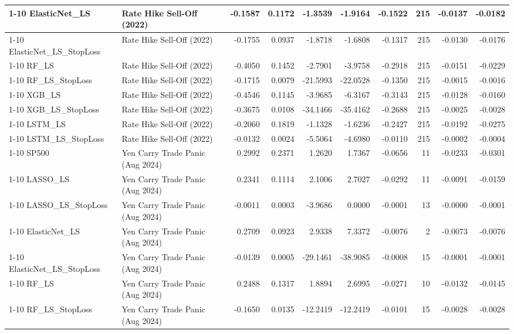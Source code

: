 \begin{tabular}{llrrrrrrrr}
\cline{1-10}
ElasticNet\_LS & Rate Hike Sell-Off (2022) & -0.1587 & 0.1172 & -1.3539 & -1.9164 & -0.1522 & 215 & -0.0137 & -0.0182 \\
\cline{1-10}
ElasticNet\_LS\_StopLoss & Rate Hike Sell-Off (2022) & -0.1755 & 0.0937 & -1.8718 & -1.6808 & -0.1317 & 215 & -0.0130 & -0.0176 \\
\cline{1-10}
RF\_LS & Rate Hike Sell-Off (2022) & -0.4050 & 0.1452 & -2.7901 & -3.9758 & -0.2918 & 215 & -0.0151 & -0.0229 \\
\cline{1-10}
RF\_LS\_StopLoss & Rate Hike Sell-Off (2022) & -0.1715 & 0.0079 & -21.5993 & -22.0528 & -0.1350 & 215 & -0.0015 & -0.0016 \\
\cline{1-10}
XGB\_LS & Rate Hike Sell-Off (2022) & -0.4546 & 0.1145 & -3.9685 & -6.3167 & -0.3143 & 215 & -0.0128 & -0.0160 \\
\cline{1-10}
XGB\_LS\_StopLoss & Rate Hike Sell-Off (2022) & -0.3675 & 0.0108 & -34.1466 & -35.4162 & -0.2688 & 215 & -0.0025 & -0.0028 \\
\cline{1-10}
LSTM\_LS & Rate Hike Sell-Off (2022) & -0.2060 & 0.1819 & -1.1328 & -1.6236 & -0.2427 & 215 & -0.0192 & -0.0275 \\
\cline{1-10}
LSTM\_LS\_StopLoss & Rate Hike Sell-Off (2022) & -0.0132 & 0.0024 & -5.5064 & -4.6980 & -0.0110 & 215 & -0.0002 & -0.0004 \\
\cline{1-10}
SP500 & Yen Carry Trade Panic (Aug 2024) & 0.2992 & 0.2371 & 1.2620 & 1.7367 & -0.0656 & 11 & -0.0233 & -0.0301 \\
\cline{1-10}
LASSO\_LS & Yen Carry Trade Panic (Aug 2024) & 0.2341 & 0.1114 & 2.1006 & 2.7027 & -0.0292 & 11 & -0.0091 & -0.0159 \\
\cline{1-10}
LASSO\_LS\_StopLoss & Yen Carry Trade Panic (Aug 2024) & -0.0011 & 0.0003 & -3.9686 & 0.0000 & -0.0001 & 13 & -0.0000 & -0.0001 \\
\cline{1-10}
ElasticNet\_LS & Yen Carry Trade Panic (Aug 2024) & 0.2709 & 0.0923 & 2.9338 & 7.3372 & -0.0076 & 2 & -0.0073 & -0.0076 \\
\cline{1-10}
ElasticNet\_LS\_StopLoss & Yen Carry Trade Panic (Aug 2024) & -0.0139 & 0.0005 & -29.1461 & -38.9085 & -0.0008 & 15 & -0.0001 & -0.0001 \\
\cline{1-10}
RF\_LS & Yen Carry Trade Panic (Aug 2024) & 0.2488 & 0.1317 & 1.8894 & 2.6995 & -0.0271 & 10 & -0.0132 & -0.0145 \\
\cline{1-10}
RF\_LS\_StopLoss & Yen Carry Trade Panic (Aug 2024) & -0.1650 & 0.0135 & -12.2419 & -12.2419 & -0.0101 & 15 & -0.0028 & -0.0028 \\

\end{tabular}
